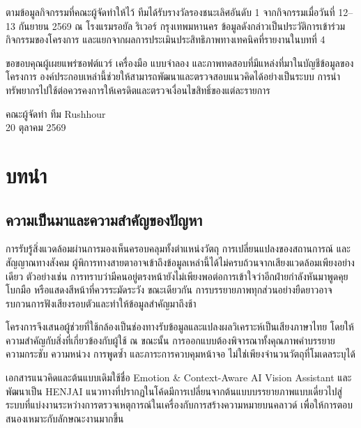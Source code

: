 ตามข้อมูลกิจกรรมที่คณะผู้จัดทำให้ไว้ ทีมได้รับรางวัลรองชนะเลิศอันดับ 1 จากกิจกรรมเมื่อวันที่ 12--13 กันยายน 2569 ณ โรงแรมรอยัล ริเวอร์ กรุงเทพมหานคร ข้อมูลดังกล่าวเป็นประวัติการเข้าร่วมกิจกรรมของโครงการ และแยกจากผลการประเมินประสิทธิภาพทางเทคนิคที่รายงานในบทที่ 4

ขอขอบคุณผู้เผยแพร่ซอฟต์แวร์ เครื่องมือ แบบจำลอง และภาพทดสอบที่มีแหล่งที่มาในบัญชีข้อมูลของโครงการ องค์ประกอบเหล่านี้ช่วยให้สามารถพัฒนาและตรวจสอบแนวคิดได้อย่างเป็นระบบ การนำทรัพยากรไปใช้ต่อควรคงการให้เครดิตและตรวจเงื่อนไขสิทธิ์ของแต่ละรายการ

\vspace{12mm}\begin{flushright}คณะผู้จัดทำ ทีม Rushhour\\20 ตุลาคม 2569\end{flushright}
\clearpage\tableofcontents
\clearpage{}\listoftables
\clearpage{}\listoffigures
\clearpage{}
\chapter{บทนำ}
\section{ความเป็นมาและความสำคัญของปัญหา}
การรับรู้สิ่งแวดล้อมผ่านการมองเห็นครอบคลุมทั้งตำแหน่งวัตถุ การเปลี่ยนแปลงของสถานการณ์ และสัญญาณทางสังคม ผู้พิการทางสายตาอาจเข้าถึงข้อมูลเหล่านี้ได้ไม่ครบถ้วนจากเสียงแวดล้อมเพียงอย่างเดียว ตัวอย่างเช่น การทราบว่ามีคนอยู่ตรงหน้ายังไม่เพียงพอต่อการเข้าใจว่าอีกฝ่ายกำลังหันมาพูดคุย โบกมือ หรือแสดงสีหน้าที่ควรระมัดระวัง ขณะเดียวกัน การบรรยายภาพทุกส่วนอย่างยืดยาวอาจรบกวนการฟังเสียงรอบตัวและทำให้ข้อมูลสำคัญมาถึงช้า

โครงการจึงเสนอผู้ช่วยที่ใช้กล้องเป็นช่องทางรับข้อมูลและแปลงผลวิเคราะห์เป็นเสียงภาษาไทย โดยให้ความสำคัญกับสิ่งที่เกี่ยวข้องกับผู้ใช้ ณ ขณะนั้น การออกแบบต้องพิจารณาทั้งคุณภาพคำบรรยาย ความกระชับ ความหน่วง การพูดซ้ำ และภาระการควบคุมหน้าจอ ไม่ใช่เพียงจำนวนวัตถุที่โมเดลระบุได้

เอกสารแนวคิดและต้นแบบเดิมใช้ชื่อ Emotion \& Context-Aware AI Vision Assistant และพัฒนาเป็น HENJAI แนวทางที่ปรากฏในโค้ดมีการเปลี่ยนจากต้นแบบบรรยายภาพแบบเดี่ยวไปสู่ระบบที่แบ่งงานระหว่างการตรวจเหตุการณ์ในเครื่องกับการสร้างความหมายบนคลาวด์ เพื่อให้การตอบสนองเหมาะกับลักษณะงานมากขึ้น

